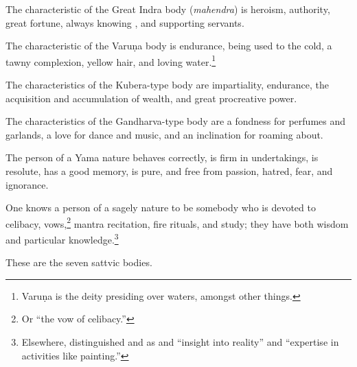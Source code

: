 \begin{translation}
\item[82]

The characteristic of the Great Indra body (\emph{mahendra}) is heroism, authority, great fortune, always knowing , and supporting servants.  

\item[83]

The characteristic of the Varuṇa body is endurance, being used to the
cold, a tawny complexion, yellow hair, and loving
water.\footnote{Varuṇa is the deity presiding over waters, amongst
    other things.}



\item[84]

The characteristics of the Kubera-type body are impartiality,
endurance, the acquisition and accumulation of wealth, and great
procreative power.

\item[85]

The characteristics of the Gandharva-type body are a fondness for
perfumes and garlands,  a love for dance and music, and an inclination
for roaming about.

\item[86]

The person of a Yama nature behaves correctly, is firm in
undertakings, is resolute, has a good memory, is pure, and free from
passion, hatred, fear, and ignorance.

\item[87]

One knows a person of a sagely nature to be somebody who is devoted to celibacy,
vows,\footnote{Or “the vow of celibacy.”} mantra recitation, fire rituals, and
study; they have both wisdom and particular knowledge.\footnote{Elsewhere,
 distinguished  and  as
 and  “insight into reality” and
“expertise in activities like painting.”}

\item[88a]

These are the seven sattvic bodies.  
\begin{table}
    \centering
    \caption{Sequence of rajasic body types}
    \label{rajasic-bodies}
    \bigskip
\small


\end{table}
\end{translation}
